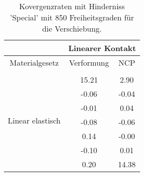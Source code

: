 \begin{table} 
\centering 
\begin{tabular}{c|cc|} 
\cline{2-3} 
 & \multicolumn{2}{|c|}{Linearer Kontakt} \\ 
\hline 
\multicolumn{1}{|c|}{Materialgesetz} & \multicolumn{1}{c|}{Verformung} & \multicolumn{1}{c|}{NCP} \\ 
\hline 
\multicolumn{1}{|c|}{\multirow{8}{*}{Linear elastisch}} &\multicolumn{1}{|c|}{} & \multicolumn{1}{|c|}{} \\ 
\multicolumn{1}{|c|}{} & \multicolumn{1}{|c|}{     15.21} & \multicolumn{1}{|c|}{      2.90} \\ 
\multicolumn{1}{|c|}{} & \multicolumn{1}{|c|}{     -0.06} & \multicolumn{1}{|c|}{     -0.04} \\ 
\multicolumn{1}{|c|}{} & \multicolumn{1}{|c|}{     -0.01} & \multicolumn{1}{|c|}{      0.04} \\ 
\multicolumn{1}{|c|}{} & \multicolumn{1}{|c|}{     -0.08} & \multicolumn{1}{|c|}{     -0.06} \\ 
\multicolumn{1}{|c|}{} & \multicolumn{1}{|c|}{      0.14} & \multicolumn{1}{|c|}{     -0.00} \\ 
\multicolumn{1}{|c|}{} & \multicolumn{1}{|c|}{     -0.10} & \multicolumn{1}{|c|}{      0.01} \\ 
\multicolumn{1}{|c|}{} & \multicolumn{1}{|c|}{      0.20} & \multicolumn{1}{|c|}{     14.38} \\ 
\hline 
\end{tabular}\caption{Kovergenzraten mit Hinderniss 'Special' mit 850 Freiheitsgraden für die Verschiebung.}\label{tab:Rate_Special_level3}
\end{table} 
